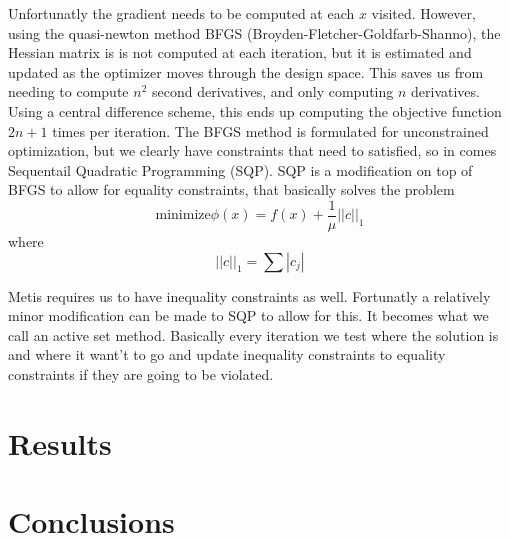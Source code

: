 \documentclass[12pt,parskip=full]{article}
\numberwithin{subsection}{section}
\begin{document}
		Unfortunatly the gradient needs to be computed at each $x$ visited. However, using the quasi-newton method BFGS (Broyden-Fletcher-Goldfarb-Shanno),
		the Hessian matrix is is not computed at each iteration, but it is estimated and updated as the optimizer moves through the design space. This saves
		us from needing to compute $n^2$ second derivatives, and only computing $n$ derivatives. Using a central difference scheme, this ends up 
		computing the objective function $2n + 1$ times per iteration. The BFGS method is formulated for unconstrained optimization, but we clearly
		have constraints that need to satisfied, so in comes Sequentail Quadratic Programming (SQP). SQP is a modification on top of BFGS to
		allow for equality constraints, that basically solves the problem
		\begin{equation}
			\mathrm{minimize} \phi(x) = f(x) + \frac{1}{\mu}||c||_1
		\end{equation}
		where
		\begin{equation}
			||c||_1 = \sum{|c_j|}
		\end{equation}

		Metis requires us to have inequality constraints as well. Fortunatly a relatively minor modification can be made to SQP to allow for this.
		It becomes what we call an active set method. Basically every iteration we test where the solution is and where it want't to go and
		update inequality constraints to equality constraints if they are going to be violated.



	\section{Results}



	\section{Conclusions}
\end{document}
